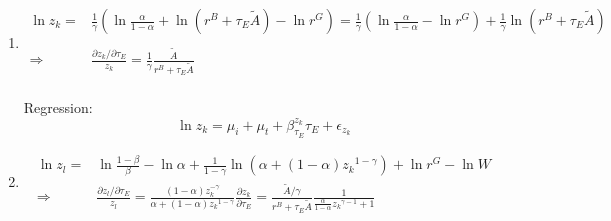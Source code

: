 \documentclass[12pt]{article} %
\begin{document}
\begin{enumerate}
    \item 
    \begin{equation*}
        \begin{split}
            \ln z_k =& \frac{1}{\gamma} (
            \ln \frac{\alpha}{1-\alpha} + \ln ({r^B + \tau_E\tilde{A}}) - \ln {r^G} ) =  \frac{1}{\gamma} (\ln \frac{\alpha}{1-\alpha} - \ln {r^G}) + \frac{1}{\gamma} \ln ({r^B + \tau_E\tilde{A}})\\
            \\
            \Rightarrow & \frac{\partial z_k/\partial \tau_E }{z_k} = \frac{1}{\gamma} \frac{\tilde{A}}{r^B + \tau_E\tilde{A}}\\
        \end{split}
    \end{equation*}

    Regression:
    \begin{equation*}
        \ln z_k = \mu_i + \mu_t + \beta_{\tau_E}^{z_k} \tau_E + \epsilon_{z_k}
    \end{equation*}



    \item 
    \begin{equation*}
        \begin{split}
            \ln z_l =& \ln \frac{1-\beta}{\beta} - \ln {\alpha} + \frac{1}{1-\gamma} \ln (\alpha + (1-\alpha) {{z_k}}^{1-\gamma}) + \ln r^G - \ln W\\
            \Rightarrow & \frac{\partial z_l/\partial \tau_E }{z_l} =  \frac{(1-\alpha)z_k^{-\gamma}}{\alpha + (1-\alpha) {{z_k}}^{1-\gamma}}\frac{\partial z_k}{\partial \tau_E} = \frac{\tilde{A}/\gamma}{r^B + \tau_E\tilde{A}}\frac{1}{\frac{\alpha}{1-\alpha}{{z_k}}^{\gamma-1} + 1}
        \end{split}
    \end{equation*}


\end{enumerate}
\end{document}
